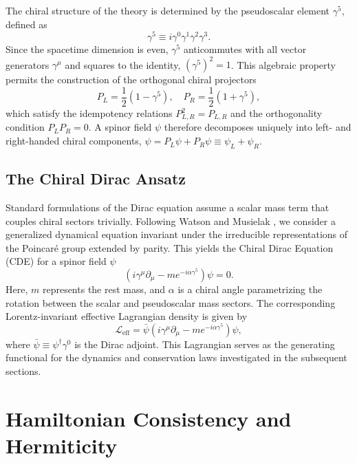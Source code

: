 The chiral structure of the theory is determined by the pseudoscalar element
$\gamma^5$, defined as
\begin{equation}
	\gamma^5 \equiv i \gamma^0 \gamma^1 \gamma^2 \gamma^3.
\end{equation}
Since the spacetime dimension is even, $\gamma^5$ anticommutes with all vector
generators $\gamma^\mu$ and squares to the identity, $(\gamma^5)^2 = 1$. This
algebraic property permits the construction of the orthogonal chiral projectors
\begin{equation}
	P_L = \frac{1}{2}(1 - \gamma^5), \quad P_R = \frac{1}{2} (1 + \gamma^5),
\end{equation}
which satisfy the idempotency relations $P_{L,R}^2 = P_{L,R}$ and the
orthogonality condition $P_L P_R = 0$. A spinor field $\psi$ therefore
decomposes uniquely into left- and right-handed chiral components, $\psi = P_L
\psi + P_R \psi \equiv \psi_L + \psi_R$.

\subsection{The Chiral Dirac Ansatz}

Standard formulations of the Dirac equation assume a scalar mass term that
couples chiral sectors trivially. Following Watson and Musielak
\cite{watsonChiralSymmetryDirac2020}, we consider a generalized dynamical
equation invariant under the irreducible representations of the Poincar\'{e}
group extended by parity. This yields the Chiral Dirac Equation (CDE) for a
spinor field $\psi$
\begin{equation}
	(i \gamma^\mu \partial_\mu - m e^{- i \alpha \gamma^5}) \psi = 0.
	\label{eq:CDE}
\end{equation}
Here, $m$ represents the rest mass, and $\alpha$ is a chiral angle parametrizing
the rotation between the scalar and pseudoscalar mass sectors. The corresponding
Lorentz-invariant effective Lagrangian density is given by
\begin{equation}
	\mathcal{L}_{\text{eff}} = \bar{\psi} (i \gamma^\mu \partial_\mu - m
	e^{- i \alpha \gamma^5}) \psi,
	\label{eq:Lagrangian}
\end{equation}
where $\bar{\psi} \equiv \psi^\dagger \gamma^0$ is the Dirac adjoint. This
Lagrangian serves as the generating functional for the dynamics and
conservation laws investigated in the subsequent sections.
\section{Hamiltonian Consistency and Hermiticity}
\label{sec:Hermiticity}

